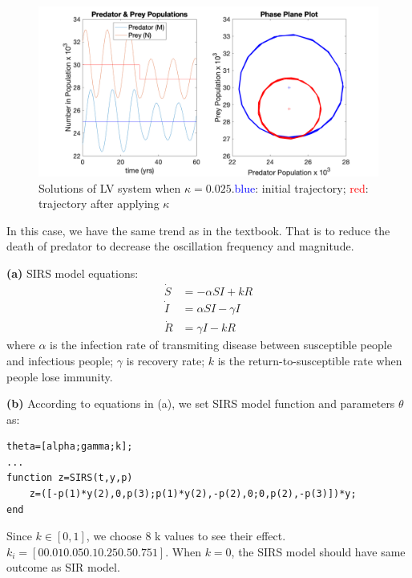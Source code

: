 \documentclass[12pt,a4paper]{article}
\begin{document}
\begin{figure}[!ht]
    \includegraphics[width=\textwidth]{hw10_7_b.png}
    \caption{Solutions of LV system when $\kappa=0.025$.\textcolor{blue}{blue}: initial trajectory; \textcolor{red}{red}: trajectory after applying $\kappa$}
\end{figure}

In this case, we have the same trend as in the textbook. That is to reduce the death of predator to decrease the oscillation frequency and magnitude. 

\newpage
{}
\textbf{(a)} 
SIRS model equations: \\
\begin{align*}
    \dot{S} &= -\alpha SI+kR\\
    \dot{I} &= \alpha SI - \gamma I\\
    \dot{R} &= \gamma I - kR
\end{align*}
where $\alpha$ is the infection rate of transmiting disease between susceptible people and infectious people; $\gamma$ is recovery rate; $k$ is the return-to-susceptible rate when people lose immunity. 

\textbf{(b)}
According to equations in (a), we set SIRS model function and parameters $\theta$ as: 

\begin{lstlisting}
theta=[alpha;gamma;k];
...
function z=SIRS(t,y,p)
    z=([-p(1)*y(2),0,p(3);p(1)*y(2),-p(2),0;0,p(2),-p(3)])*y;
end
\end{lstlisting}

Since $k\in[0,1]$, we choose 8 k values to see their effect. $k_i=[0 0.01 0.05 0.1 0.25 0.5 0.75 1]$. When $k=0$, the SIRS model should have same outcome as SIR model. 
\end{document}
